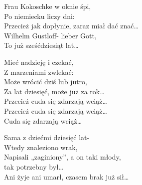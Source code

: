 \begin{text}
    Frau Kokoschke w oknie śpi,\\
    Po niemiecku liczy dni:\\
    Przecież jak dopłynie, zaraz miał dać znać…\\
    Wilhelm Gustloff- lieber Gott,\\
    To już sześćdziesiąt lat…

    Mieć nadzieję i czekać,\\
    Z marzeniami zwlekać:\\
    Może wrócić dziś lub jutro,\\
    Za lat dziesięć, może już za rok…\\
    Przecież cuda się zdarzają wciąż…\\
    Przecież cuda się zdarzają wciąż…\\
    Cuda się zdarzają wciąż…

    Sama z dziećmi dziesięć lat-\\
    Wtedy znaleziono wrak,\\
    Napisali „zaginiony”, a on taki młody,\\
    tak potrzebny był…\\
    Ani żyje ani umarł, czasem brak już sił…
\end{text}
\begin{chord}

\end{chord}